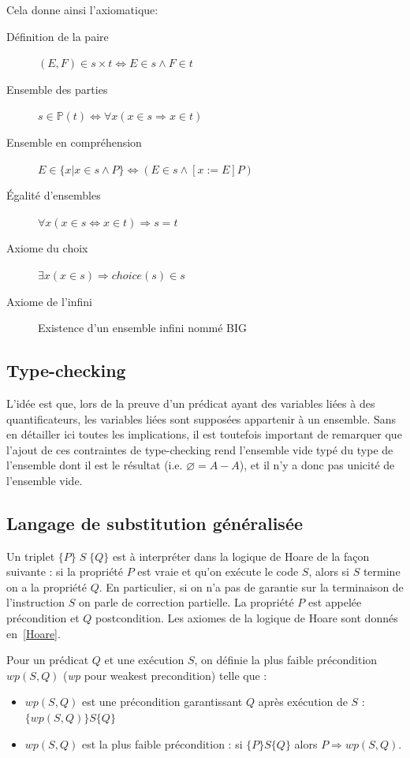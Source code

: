 \documentclass[10pt,a4paper]{article}
\begin{document}
Cela donne ainsi l'axiomatique:
\begin{description}
\item[Définition de la paire] $(E, F) \in s \times t \Leftrightarrow E \in s \wedge F \in t$
\item[Ensemble des parties] $s \in \mathbb{P}(t) \Leftrightarrow \forall x (x \in s \Rightarrow x \in t)$
\item[Ensemble en compréhension] $E \in \{ x | x \in s \wedge P \} \Leftrightarrow (E \in s \wedge [x:= E] P)$
\item[Égalité d'ensembles] $\forall x (x \in s \Leftrightarrow x \in t) \Rightarrow s = t$
\item[Axiome du choix] $\exists x  (x \in s) \Rightarrow choice(s) \in s$
\item[Axiome de l'infini] Existence d'un ensemble infini nommé BIG
\end{description}

\subsection{Type-checking}

L'idée est que, lors de la preuve d'un prédicat ayant des variables liées à des quantificateurs, les variables liées sont supposées appartenir à un ensemble.
Sans en détailler ici toutes les implications, il est toutefois important de remarquer que l'ajout de ces contraintes de type-checking rend l'ensemble vide typé du type de l'ensemble dont il est le résultat (i.e. $\varnothing = A - A$), et il n'y a donc pas unicité de l'ensemble vide. 

\subsection{Langage de substitution généralisée}

Un triplet $ \{P\}\;S\;\{Q\} $ est à interpréter dans la logique de Hoare de la façon suivante : si la propriété $P$ est vraie et qu'on exécute le code $S$, alors si $S$ termine on a la propriété $Q$. En particulier, si on n'a pas de garantie sur la terminaison de l'instruction $S$ on parle de correction partielle. La propriété $P$ est appelée précondition et $Q$ postcondition. Les axiomes de la logique de Hoare sont donnés en~\cref{Hoare}.

Pour un prédicat $Q$ et une exécution $S$, on définie la plus faible précondition $wp(S, Q)$ (\emph{wp} pour weakest precondition) telle que :
\begin{itemize}
\item $wp(S, Q)$ est une précondition garantissant $Q$  après exécution de $S$ : $ \{ wp(S, Q) \} S \{ Q\}$
\item $wp(S, Q)$  est la plus faible précondition : si $\{ P \} S \{ Q \}$ alors $P \Rightarrow wp(S, Q)$.
\end{itemize}~
\end{document}
